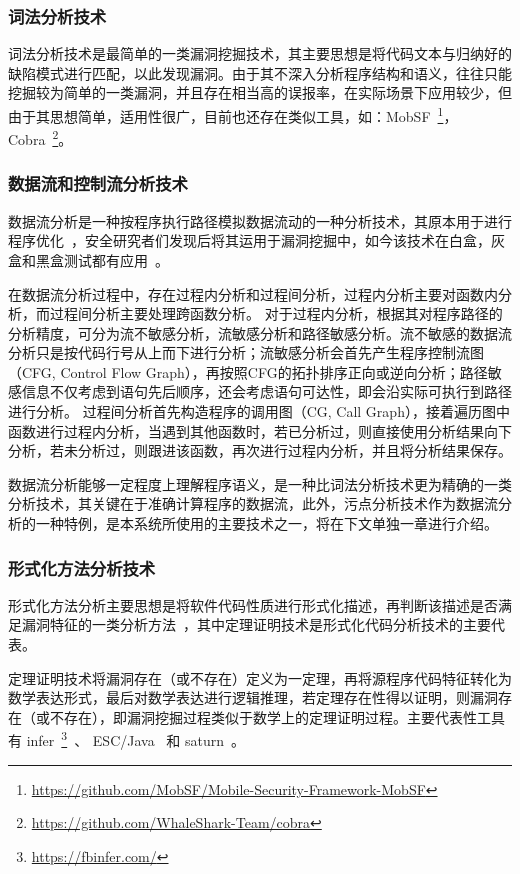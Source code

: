 \subsubsection{词法分析技术}
词法分析技术是最简单的一类漏洞挖掘技术，其主要思想是将代码文本与归纳好的缺陷模式进行匹配，以此发现漏洞。由于其不深入分析程序结构和语义，往往只能挖掘较为简单的一类漏洞，并且存在相当高的误报率，在实际场景下应用较少，但由于其思想简单，适用性很广，目前也还存在类似工具，如：MobSF~\footnote{\url{https://github.com/MobSF/Mobile-Security-Framework-MobSF}}，Cobra~\footnote{\url{https://github.com/WhaleShark-Team/cobra}}。

\subsubsection{数据流和控制流分析技术}
数据流分析是一种按程序执行路径模拟数据流动的一种分析技术，其原本用于进行程序优化~\cite{Kildall1973}，安全研究者们发现后将其运用于漏洞挖掘中，如今该技术在白盒，灰盒和黑盒测试都有应用~\cite{Shastry2016}。

在数据流分析过程中，存在过程内分析和过程间分析，过程内分析主要对函数内分析，而过程间分析主要处理跨函数分析。
对于过程内分析，根据其对程序路径的分析精度，可分为流不敏感分析，流敏感分析和路径敏感分析。流不敏感的数据流分析只是按代码行号从上而下进行分析；流敏感分析会首先产生程序控制流图（CFG, Control Flow Graph），再按照CFG的拓扑排序正向或逆向分析；路径敏感信息不仅考虑到语句先后顺序，还会考虑语句可达性，即会沿实际可执行到路径进行分析。
过程间分析首先构造程序的调用图（CG, Call Graph），接着遍历图中函数进行过程内分析，当遇到其他函数时，若已分析过，则直接使用分析结果向下分析，若未分析过，则跟进该函数，再次进行过程内分析，并且将分析结果保存。

数据流分析能够一定程度上理解程序语义，是一种比词法分析技术更为精确的一类分析技术，其关键在于准确计算程序的数据流，此外，污点分析技术作为数据流分析的一种特例，是本系统所使用的主要技术之一，将在下文单独一章进行介绍。

\subsubsection{形式化方法分析技术}
形式化方法分析主要思想是将软件代码性质进行形式化描述，再判断该描述是否满足漏洞特征的一类分析方法~\cite{B:automatedTheoremProving}，其中定理证明技术是形式化代码分析技术的主要代表。

定理证明技术将漏洞存在（或不存在）定义为一定理，再将源程序代码特征转化为数学表达形式，最后对数学表达进行逻辑推理，若定理存在性得以证明，则漏洞存在（或不存在），即漏洞挖掘过程类似于数学上的定理证明过程。主要代表性工具有 infer~\footnote{\url{https://fbinfer.com/}}~\cite{atp:infer}、 ESC/Java~\cite{atp:escjava} 和 saturn~\cite{atp:saturn}。

